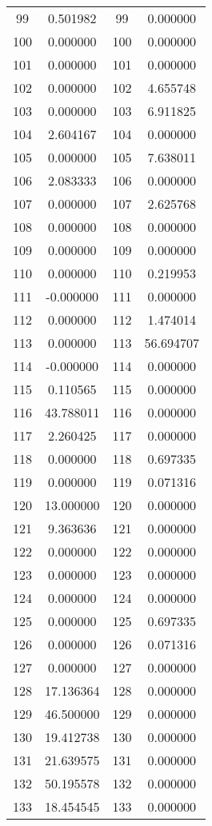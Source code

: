 \documentclass[12pt]{article}
\begin{document}
\begin{longtable}{@{}cccc@{}}
99 & 0.501982 & 99 & 0.000000 \\
100 & 0.000000 & 100 & 0.000000 \\
101 & 0.000000 & 101 & 0.000000 \\
102 & 0.000000 & 102 & 4.655748 \\
103 & 0.000000 & 103 & 6.911825 \\
104 & 2.604167 & 104 & 0.000000 \\
105 & 0.000000 & 105 & 7.638011 \\
106 & 2.083333 & 106 & 0.000000 \\
107 & 0.000000 & 107 & 2.625768 \\
108 & 0.000000 & 108 & 0.000000 \\
109 & 0.000000 & 109 & 0.000000 \\
110 & 0.000000 & 110 & 0.219953 \\
111 & -0.000000 & 111 & 0.000000 \\
112 & 0.000000 & 112 & 1.474014 \\
113 & 0.000000 & 113 & 56.694707 \\
114 & -0.000000 & 114 & 0.000000 \\
115 & 0.110565 & 115 & 0.000000 \\
116 & 43.788011 & 116 & 0.000000 \\
117 & 2.260425 & 117 & 0.000000 \\
118 & 0.000000 & 118 & 0.697335 \\
119 & 0.000000 & 119 & 0.071316 \\
120 & 13.000000 & 120 & 0.000000 \\
121 & 9.363636 & 121 & 0.000000 \\
122 & 0.000000 & 122 & 0.000000 \\
123 & 0.000000 & 123 & 0.000000 \\
124 & 0.000000 & 124 & 0.000000 \\
125 & 0.000000 & 125 & 0.697335 \\
126 & 0.000000 & 126 & 0.071316 \\
127 & 0.000000 & 127 & 0.000000 \\
128 & 17.136364 & 128 & 0.000000 \\
129 & 46.500000 & 129 & 0.000000 \\
130 & 19.412738 & 130 & 0.000000 \\
131 & 21.639575 & 131 & 0.000000 \\
132 & 50.195578 & 132 & 0.000000 \\
133 & 18.454545 & 133 & 0.000000 \\

\end{longtable}
\end{document}
